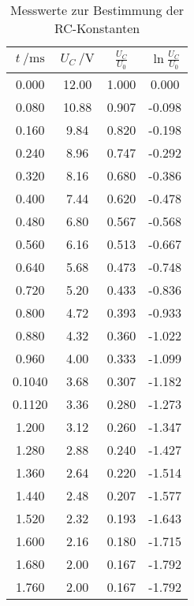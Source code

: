 \begin{table}[H]
  \centering
  \caption{Messwerte zur Bestimmung der RC-Konstanten}
  \label{tab:tabe1}
    \begin{tabular}{c c c c}
    \toprule
    $ t \: / \si{\milli\second} $ & $ U_C \: / \si {\volt} $ & $\frac{U_C}{U_0} $
    & $ \ln{\frac{U_C}{U_0}} $ \\
    \midrule
    0.000 & 12.00 & 1.000 & 0.000 \\
    0.080 & 10.88 & 0.907 & -0.098 \\
    0.160 & 9.84 & 0.820 & -0.198 \\
    0.240 & 8.96 & 0.747 & -0.292 \\
    0.320 & 8.16 & 0.680 & -0.386 \\
    0.400 & 7.44 & 0.620 & -0.478 \\
    0.480 & 6.80 & 0.567 & -0.568 \\
    0.560 & 6.16 & 0.513 & -0.667 \\
    0.640 & 5.68 & 0.473 & -0.748 \\
    0.720 & 5.20 & 0.433 & -0.836 \\
    0.800 & 4.72 & 0.393 & -0.933 \\
    0.880 & 4.32 & 0.360 & -1.022 \\
    0.960 & 4.00 & 0.333 & -1.099 \\
    0.1040 & 3.68 & 0.307 & -1.182 \\
    0.1120 & 3.36 & 0.280 & -1.273 \\
    1.200 & 3.12 & 0.260 & -1.347 \\
    1.280 & 2.88 & 0.240 & -1.427 \\
    1.360 & 2.64 & 0.220 & -1.514 \\
    1.440 & 2.48 & 0.207 & -1.577 \\
    1.520 & 2.32 & 0.193 & -1.643 \\
    1.600 & 2.16 & 0.180 & -1.715 \\
    1.680 & 2.00 & 0.167 & -1.792 \\
    1.760 & 2.00 & 0.167 & -1.792 \\

      \bottomrule
    \end{tabular}
\end{table}
